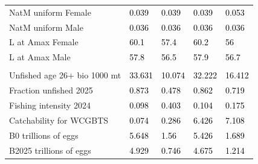 \documentclass[
]{scrartcl}
\begin{document}
\begin{landscape}
\begin{longtable}[t]{ll>{\raggedright\arraybackslash}p{5em}>{\raggedright\arraybackslash}p{5em}>{\raggedright\arraybackslash}p{5em}}
\hspace{1em}NatM uniform Female & \textcolor{black}{0.039} & \textcolor{black}{0.039} & \textcolor{black}{0.039} & \textcolor{black}{0.053}\\
\hspace{1em}NatM uniform Male & \textcolor{black}{0.036} & \textcolor{black}{0.036} & \textcolor{black}{0.036} & \textcolor{black}{0.036}\\
\hspace{1em}L at Amax Female & \textcolor{black}{60.1} & \textcolor{black}{57.4} & \textcolor{black}{60.2} & \textcolor{black}{56}\\
\hspace{1em}L at Amax Male & \textcolor{black}{57.8} & \textcolor{black}{56.5} & \textcolor{black}{57.9} & \textcolor{black}{56.7}\\
\addlinespace[0.3em]
\multicolumn{5}{l}{\textbf{Estimates of derived quantities}}\\
\hspace{1em}Unfished age 26+ bio 1000 mt & \textcolor{black}{33.631} & \textcolor{black}{10.074} & \textcolor{black}{32.222} & \textcolor{black}{16.412}\\
\hspace{1em}Fraction unfished 2025 & \textcolor{black}{0.873} & \textcolor{black}{0.478} & \textcolor{black}{0.862} & \textcolor{black}{0.719}\\
\hspace{1em}Fishing intensity 2024 & \textcolor{black}{0.098} & \textcolor{black}{0.403} & \textcolor{black}{0.104} & \textcolor{black}{0.175}\\
\hspace{1em}Catchability for WCGBTS & \textcolor{black}{0.074} & \textcolor{black}{0.286} & \textcolor{black}{6.426} & \textcolor{black}{7.108}\\
\hspace{1em}B0 trillions of eggs & \textcolor{black}{5.648} & \textcolor{black}{1.56} & \textcolor{black}{5.426} & \textcolor{black}{1.689}\\
\hspace{1em}B2025 trillions of eggs & \textcolor{black}{4.929} & \textcolor{black}{0.746} & \textcolor{black}{4.675} & \textcolor{black}{1.214}\\
\bottomrule

\end{longtable}

\endgroup{}


\end{landscape}
\end{document}
